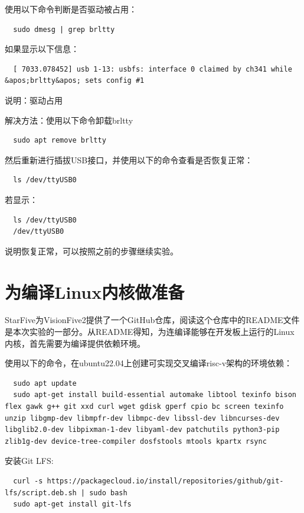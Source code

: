 \documentclass[lang=cn,10pt]{elegantbook}
\begin{document}
使用以下命令判断是否驱动被占用：
\begin{lstlisting}
  sudo dmesg | grep brltty
\end{lstlisting}
如果显示以下信息：

\begin{lstlisting}
  [ 7033.078452] usb 1-13: usbfs: interface 0 claimed by ch341 while &apos;brltty&apos; sets config #1
\end{lstlisting}

说明：驱动占用

解决方法：使用以下命令卸载brltty

\begin{lstlisting}
  sudo apt remove brltty
\end{lstlisting}

然后重新进行插拔USB接口，并使用以下的命令查看是否恢复正常：

\begin{lstlisting}
  ls /dev/ttyUSB0 
\end{lstlisting}
若显示：

\begin{lstlisting}
  ls /dev/ttyUSB0 
  /dev/ttyUSB0
\end{lstlisting}
说明恢复正常，可以按照之前的步骤继续实验。

\section{为编译Linux内核做准备}

StarFive为VisionFive2提供了一个GitHub仓库，阅读这个仓库中的README文件是本次实验的一部分。从README得知，为连编译能够在开发板上运行的Linux内核，首先需要为编译提供依赖环境。

使用以下的命令，在ubuntu22.04上创建可实现交叉编译risc-v架构的环境依赖：

\begin{lstlisting}
  sudo apt update
  sudo apt-get install build-essential automake libtool texinfo bison flex gawk g++ git xxd curl wget gdisk gperf cpio bc screen texinfo unzip libgmp-dev libmpfr-dev libmpc-dev libssl-dev libncurses-dev libglib2.0-dev libpixman-1-dev libyaml-dev patchutils python3-pip zlib1g-dev device-tree-compiler dosfstools mtools kpartx rsync
\end{lstlisting}
安装Git LFS:

\begin{lstlisting}
  curl -s https://packagecloud.io/install/repositories/github/git-lfs/script.deb.sh | sudo bash
  sudo apt-get install git-lfs
\end{lstlisting}
\end{document}
